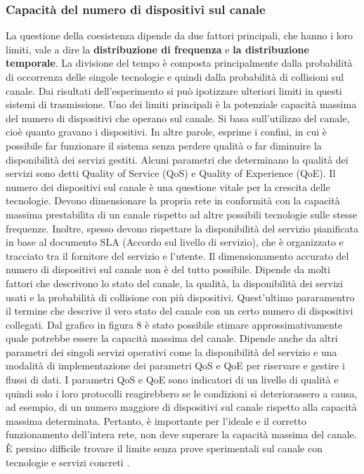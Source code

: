 \documentclass[a4paper]{report} %
\begin{document}
\subsubsection{Capacità del numero di dispositivi sul canale}
La questione della coesistenza dipende da due fattori principali, che hanno i loro limiti, vale a dire la \textbf{distribuzione di frequenza} e \textbf{la distribuzione temporale}. La divisione del tempo è composta principalmente dalla probabilità di occorrenza delle singole tecnologie e quindi dalla probabilità di collisioni sul canale. Dai risultati  dell'esperimento \cite{art:rif.46} si può ipotizzare ulteriori limiti in questi sistemi di trasmissione. Uno dei limiti principali è la potenziale capacità massima del numero di dispositivi che operano sul canale. Si basa sull'utilizzo del canale, cioè quanto gravano i dispositivi. In altre parole, esprime i confini, in cui è possibile far funzionare il sistema senza perdere qualità o far diminuire la disponibilità dei servizi gestiti. Alcuni parametri che determinano la qualità dei servizi sono detti Quality of Service (QoS) e Quality of Experience (QoE). Il numero dei dispositivi sul canale è una questione vitale per la crescita delle tecnologie. Devono dimensionare la propria rete in conformità con la capacità massima prestabilita di un canale rispetto ad altre possibili tecnologie sulle stesse frequenze. Inoltre, spesso devono rispettare la disponibilità del servizio pianificata in base al documento SLA (Accordo sul livello di servizio), che è organizzato e tracciato tra il fornitore del servizio e l'utente. Il dimensionamento accurato del numero di dispositivi sul canale non è del tutto possibile. Dipende da molti fattori che descrivono lo stato del canale, la qualità, la disponibilità dei servizi usati e la probabilità di collisione con più dispositivi. Quest'ultimo pararamentro il termine che descrive il vero stato del canale con un certo numero di dispositivi collegati. Dal grafico in figura 8 è stato possibile stimare approssimativamente quale potrebbe essere la capacità massima del canale. Dipende anche da altri parametri dei singoli servizi operativi come la disponibilità del servizio e una modalità di implementazione dei parametri QoS e QoE per riservare e gestire i flussi di dati. I parametri QoS e QoE sono indicatori di un livello di qualità e quindi solo i loro protocolli reagirebbero se le condizioni si deteriorassero a causa, ad esempio, di un numero maggiore di dispositivi sul canale rispetto alla capacità massima determinata. Pertanto, è importante per l'ideale e il corretto funzionamento dell'intera rete, non deve superare la capacità massima del canale. È persino difficile trovare il limite senza prove sperimentali sul canale con tecnologie e servizi concreti \cite{art:rif.46}.
\end{document}
